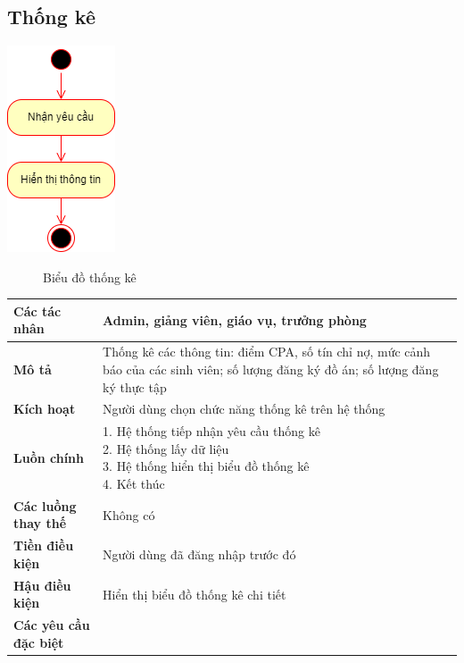 \subsection{Thống kê}
\begin{center}
	\includegraphics[width=.3\textwidth]{../drawio/activity/statistical.png}
	\begin{figure}[h]
		\centering
		\caption{Biểu đồ thống kê}
	\end{figure}
\end{center}
\begin{tabular}{|l|l|}
	\hline
	\textbf{Các tác nhân}         & Admin, giảng viên, giáo vụ, trưởng phòng                                                                                           \\
	\hline
	\textbf{Mô tả}                & Thống kê các thông tin: điểm CPA, số tín chỉ nợ, mức cảnh báo của các sinh viên; số lượng đăng ký đồ án; số lượng đăng ký thực tập \\
	\hline
	\textbf{Kích hoạt}            & Người dùng chọn chức năng thống kê trên hệ thống                                                                                   \\
	\hline
	\textbf{Luồn chính}           & \makecell[l]{1. Hệ thống tiếp nhận yêu cầu thống kê                                                                                \\ 2. Hệ thống lấy dữ liệu \\ 3. Hệ thống hiển thị biểu đồ thống kê \\ 4. Kết thúc} \\
	\hline
	\textbf{Các luồng thay thế}   & Không có                                                                                                                           \\
	\hline
	\textbf{Tiền điều kiện}       & Người dùng đã đăng nhập trước đó                                                                                                   \\
	\hline
	\textbf{Hậu điều kiện}        & Hiển thị biểu đồ thống kê chi tiết                                                                                                 \\
	\hline
	\textbf{Các yêu cầu đặc biệt} &                                                                                                                                    \\
	\hline
\end{tabular}

